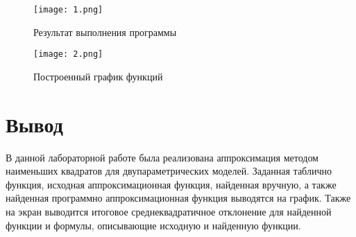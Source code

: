 \documentclass[a4paper, 14pt]{extarticle}
\begin{document}
\begin{figure}[H]
	
	\centering
	
	\texttt{[image: 1.png]}
	\captionsetup{justification=centering}
	\caption{Результат выполнения программы}
	
	\label{fig:mpr}
	
\end{figure}

\begin{figure}[H]
	
	\centering
	
	\texttt{[image: 2.png]}
	\captionsetup{justification=centering}
	\caption{Построенный график функций}
	
	\label{fig:mpr}
	
\end{figure}

\pagebreak

\section{Вывод}
В данной лабораторной работе была реализована аппроксимация методом наименьших квадратов для двупараметрических моделей.
Заданная таблично функция, исходная аппроксимационная функция, найденная вручную, а также найденная программно аппроксимационная функция выводятся на график. Также на экран выводится итоговое среднеквадратичное отклонение для 
найденной функции и формулы, описывающие исходную и найденную функции.
\end{document}
